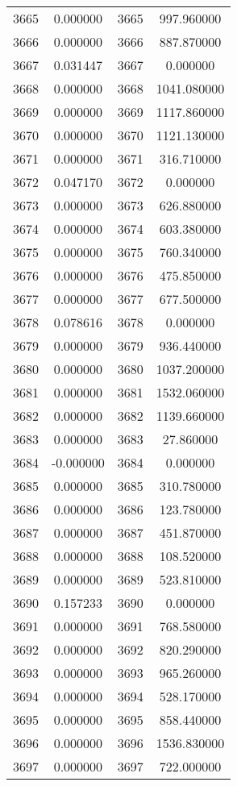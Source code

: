 \documentclass[12pt]{article}
\begin{document}
\begin{longtable}{@{}cccc@{}}
3665 & 0.000000 & 3665 & 997.960000 \\
3666 & 0.000000 & 3666 & 887.870000 \\
3667 & 0.031447 & 3667 & 0.000000 \\
3668 & 0.000000 & 3668 & 1041.080000 \\
3669 & 0.000000 & 3669 & 1117.860000 \\
3670 & 0.000000 & 3670 & 1121.130000 \\
3671 & 0.000000 & 3671 & 316.710000 \\
3672 & 0.047170 & 3672 & 0.000000 \\
3673 & 0.000000 & 3673 & 626.880000 \\
3674 & 0.000000 & 3674 & 603.380000 \\
3675 & 0.000000 & 3675 & 760.340000 \\
3676 & 0.000000 & 3676 & 475.850000 \\
3677 & 0.000000 & 3677 & 677.500000 \\
3678 & 0.078616 & 3678 & 0.000000 \\
3679 & 0.000000 & 3679 & 936.440000 \\
3680 & 0.000000 & 3680 & 1037.200000 \\
3681 & 0.000000 & 3681 & 1532.060000 \\
3682 & 0.000000 & 3682 & 1139.660000 \\
3683 & 0.000000 & 3683 & 27.860000 \\
3684 & -0.000000 & 3684 & 0.000000 \\
3685 & 0.000000 & 3685 & 310.780000 \\
3686 & 0.000000 & 3686 & 123.780000 \\
3687 & 0.000000 & 3687 & 451.870000 \\
3688 & 0.000000 & 3688 & 108.520000 \\
3689 & 0.000000 & 3689 & 523.810000 \\
3690 & 0.157233 & 3690 & 0.000000 \\
3691 & 0.000000 & 3691 & 768.580000 \\
3692 & 0.000000 & 3692 & 820.290000 \\
3693 & 0.000000 & 3693 & 965.260000 \\
3694 & 0.000000 & 3694 & 528.170000 \\
3695 & 0.000000 & 3695 & 858.440000 \\
3696 & 0.000000 & 3696 & 1536.830000 \\
3697 & 0.000000 & 3697 & 722.000000 \\

\end{longtable}
\end{document}
